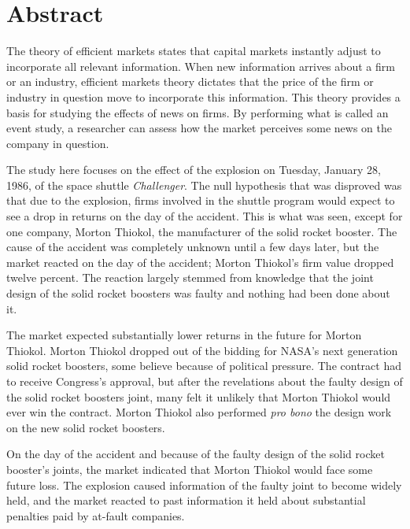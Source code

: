 \chapter*{Abstract} 

The theory of efficient markets states that capital markets instantly adjust to incorporate all relevant information. When new information arrives about a firm or an industry, efficient markets theory dictates that the price of the firm or industry in question move to incorporate this information. This theory provides a basis for studying the effects of news on firms. By performing what is called an event study, a researcher can assess how the market perceives some news on the company in question.

The study here focuses on the effect of the explosion on Tuesday, January 28, 1986, of the space shuttle {\em Challenger}. The null hypothesis that was disproved was that due to the explosion, firms involved in the shuttle program would expect to see a drop in returns on the day of the accident. This is what was seen, except for one company, Morton Thiokol, the manufacturer of the solid rocket booster. The cause of the accident was completely unknown until a few days later, but the market reacted on the day of the accident; Morton Thiokol's firm value dropped twelve percent. The reaction largely stemmed from knowledge that the joint design of the solid rocket boosters was faulty and nothing had been done about it.

The market expected substantially lower returns in the future for Morton Thiokol. Morton Thiokol dropped out of the bidding for NASA's next generation solid rocket boosters, some believe because of political pressure. The contract had to receive Congress's approval, but after the revelations about the faulty design of the solid rocket boosters joint, many felt it unlikely that Morton Thiokol would ever win the contract. Morton Thiokol also performed {\em pro bono} the design work on the new solid rocket boosters.

On the day of the accident and because of the faulty design of the solid rocket booster's joints, the market indicated that Morton Thiokol would face some future loss. The explosion caused information of the faulty joint to become widely held, and the market reacted to past information it held about substantial penalties paid by at-fault companies.
